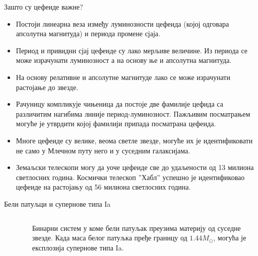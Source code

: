 \documentclass[aspectratio=169, xcolor=table, 10pt]{beamer}
\begin{document}
\begin{frame}{Зашто су цефеиде важне?}
  \begin{itemize}
    \item Постоји линеарна веза између луминозности цефеида (којој одговара апсолутна магнитуда) и периода промене сјаја.
    \item Период и привидни сјај цефеиде су лако мерљиве величине. Из периода се може израчунати луминозност а на основу ње и апсолутна магнитуда.
    \item На основу релативне и апсолутне магнитуде лако се може израчунати растојање до звезде.
    \item Рачуницу компликује чињеница да постоје две фамилије цефида са различитим нагибима линије период-луминозност. Пажљивим посматрањем могуће је утврдити којој фамилији припада посматрана цефеида.
    \item Многе цефеиде су велике, веома светле звезде, могуће их је идентификовати не само у Млечном путу него и у суседним галаксијама.
    \item Земаљски телескопи могу да уоче цефеиде све до удаљености од 13 милиона светлосних година. Космички телескоп ”Хабл” успешно је идентификовао цефеиде на растојању од 56 милиона светлосних година.
  \end{itemize}
\end{frame}

\begin{frame}{Бели патуљци и супернове типа Ia}
  \begin{columns}[T]
    \begin{column}{0.7\textwidth}
      \begin{figure}
        \centering
        \vspace{-1em}
      \end{figure}
    \end{column}
    \begin{column}{0.3\textwidth}
      Бинарни систем у коме бели патуљак преузима материју од суседне звезде. Када маса белог патуљка пређе границу од $1.44 M_{\odot}$, могућа је експлозија супернове типа Ia.
    \end{column}
  \end{columns}
\end{frame}
\end{document}
